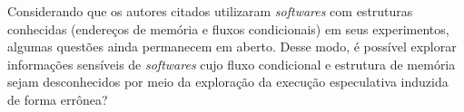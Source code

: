 \documentclass[
	article,			    %
	12pt,				    %
	oneside,			    %
	a4paper,			    %
	chapter=TITLE,		    %
	section=TITLE,		    %
	subsection=TITLE,	    %
	english,			    %
	brazil,				    %
	sumario=tradicional
]{abntex2}
\begin{document}
\begin{comment}
\subsection{Tema}
A execução especulativa é uma técnica de projeto de microarquitetura, que proporciona o aprimoramento da velocidade de processamento nos processadores modernos. Está presente em muitos processadores de vários fabricantes, incluindo \emph{Intel}, \emph{AMD} e \emph{ARM Holdings}. Esta técnica consiste na estimativa e execução de instruções, com valores ainda não conhecidos pela CPU, durante um período curto de inatividade (que acontece durante a espera de valores reais, provenientes da memória principal, que é mais lenta do que a memória cache).

Do ponto de vista de funcional, esta especulação traria problemas se os resultados de especulações incorretas fossem efetivados. Porém, quando a verdadeira informação é recuperada, a CPU verifica a exatidão da suposição e descarta o ``caminho'' (fluxo de execução) que foi executado incorretamente. Eliminando valores nos registradores, ou alterações em variáveis por exemplo.

Apoderando-se do conhecimento microarquitetural necessário para se conhecer em quais situações e em quais instruções a execução especulativa ocorre, é possível um atacante forçar ou induzir a execução especulativa, por ``viciar'' o processador em uma cadeia de especulações e transferir as informações especuladas para um canal alternativo (como por exemplo, a memória cache). Caso a transferência seja bem-sucedida, o atacante efetua a leitura dos dados presentes no canal alternativo, neste caso na memória cache, medindo o tempo de acesso aos dados que foram especulados e comparando-os com um tempo médio de acesso (à memória cache) conhecido. Caso a informação demore de ser recuperada (baseando-se na média), supõe-se que ela não se encontra na memória cache. Caso contrário, o atacante acertou a suposição da informação correta.
\end{comment}
Considerando que os autores citados utilizaram \emph{softwares} com estruturas conhecidas (endereços de memória e fluxos condicionais) em seus experimentos, algumas questões ainda permanecem em aberto. Desse modo, é possível explorar informações sensíveis de \emph{softwares} cujo fluxo condicional e estrutura de memória sejam desconhecidos por meio da exploração da execução especulativa induzida de forma errônea?
\end{document}
